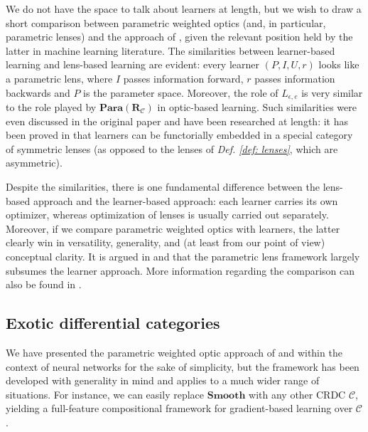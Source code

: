 \documentclass[11pt,a4paper,openright,twoside]{report}
\theoremstyle{plain}
\theoremstyle{definition}
\begin{document}
We do not have the space to talk about learners at length, but we wish to draw a short comparison between parametric weighted optics (and, in particular, parametric lenses) and the approach of \cite{fong2019backprop}, given the relevant position held by the latter in machine learning literature. The similarities between learner-based learning and lens-based learning are evident: every learner $(P, I, U, r)$ looks like a parametric lens, where $I$ passes information forward, $r$ passes information backwards and $P$ is the parameter space. Moreover, the role of $L_{\epsilon, e}$ is very similar to the role played by $\mathbf{Para}(\mathbf{R}_{\mathcal{C}})$ in optic-based learning. Such similarities were even discussed in the original paper \cite{fong2019backprop} and have been researched at length: it has been proved in \cite{fong2019lenses} that learners can be functorially embedded in a special category of symmetric lenses (as opposed to the lenses of \textit{Def. \ref{def: lenses}}, which are asymmetric).

Despite the similarities, there is one fundamental difference between the lens-based approach and the learner-based approach: each learner carries its own optimizer, whereas optimization of lenses is usually carried out separately. Moreover, if we compare parametric weighted optics with learners, the latter clearly win in versatility, generality, and (at least from our point of view) conceptual clarity. It is argued in \cite{shiebler2021category} and \cite{cruttwell2022categorical} that the parametric lens framework largely subsumes the learner approach. More information regarding the comparison can also be found in \cite{gavranovic2024fundamental}.

\subsection{Exotic differential categories}

We have presented the parametric weighted optic approach of \cite{gavranovic2024fundamental} and \cite{cruttwell2022categorical} within the context of neural networks for the sake of simplicity, but the framework has been developed with generality in mind and applies to a much wider range of situations. For instance, we can easily replace $\mathbf{Smooth}$ with any other CRDC $\mathcal{C}$, yielding a full-feature compositional framework for gradient-based learning over $\mathcal{C}$.
\end{document}
